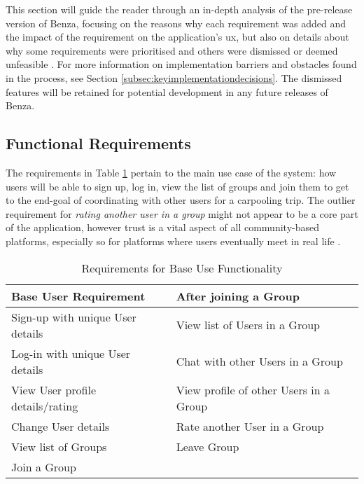 \documentclass{article}
\begin{document}
    This section will guide the reader through an in-depth analysis of the pre-release version of Benza, focusing on the reasons why each requirement was added and the impact of the requirement on the application's \acrlong{ux}, but also on details about why some requirements were prioritised and others were dismissed or deemed unfeasible . For more information on implementation barriers and obstacles found in the process, see Section \ref{subsec:keyimplementationdecisions}. The dismissed features will be retained for potential development in any future releases of Benza. \par

    \subsection{Functional Requirements}
    \label{subsec:functionalreq}
    The requirements in Table \ref{tab:userfunctionality} pertain to the main use case of the system: how users will be able to sign up, log in, view the list of groups and join them to get to the end-goal of coordinating with other users for a carpooling trip. The outlier requirement for \emph{rating another user in a group} might not appear to be a core part of the application, however trust is a vital aspect of all community-based platforms, especially so for platforms where users eventually meet in real life \cite{blablacarslideshare}. \par
    
    \newcommand{\ra}[1]{\renewcommand{\arraystretch}{#1}}
    \begin{table}[ht]
        \centering
        \ra{1.2}
        \begin{tabular}{@{}ll@{}} \toprule
        Base User Requirement               & After joining a Group                 \\ \midrule
        Sign-up with unique User details    & View list of Users in a Group         \\[3pt]
        Log-in with unique User details     & Chat with other Users in a Group      \\[3pt]
        View User profile details/rating    & View profile of other Users in a Group\\[3pt]
        Change User details                 & Rate another User in a Group          \\[3pt]
        View list of Groups                 & Leave Group                           \\[3pt]
        Join a Group                        &                                       \\ \bottomrule
        \end{tabular}
        \caption{Requirements for Base Use Functionality}
        \label{tab:userfunctionality}
    \end{table}
    
\end{document}

